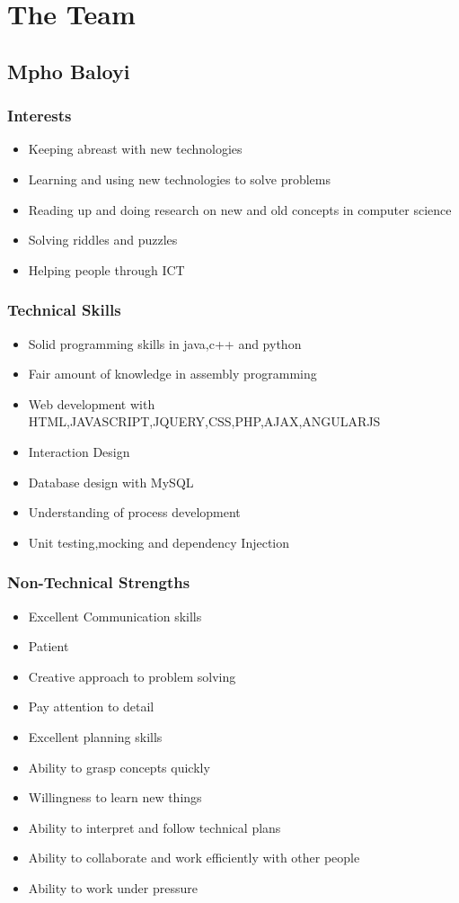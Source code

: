 \documentclass[a4paper,12pt]{article}
\begin{document}
\newpage
\tableofcontents
\newpage
\section{The Team}
\subsection{Mpho Baloyi}
\subsubsection{Interests}
\begin{itemize}
\item Keeping abreast with new technologies
\item Learning and using new technologies to solve problems
\item Reading up and doing research on new and old concepts in computer science
\item Solving riddles and puzzles
\item Helping people through ICT
\end{itemize}
\subsubsection{Technical Skills}
\begin{itemize}
\item Solid programming skills in java,c++ and python
\item Fair amount of knowledge in assembly programming 
\item Web development with HTML,JAVASCRIPT,JQUERY,CSS,PHP,AJAX,ANGULARJS
\item Interaction Design 
\item Database design with MySQL
\item Understanding of process development
\item Unit testing,mocking and dependency Injection
\end{itemize}
\subsubsection{Non-Technical Strengths}
\begin{itemize}
\item Excellent Communication skills
\item Patient 
\item Creative approach to problem solving
\item Pay attention to detail 
\item Excellent planning skills
\item Ability to grasp concepts quickly
\item Willingness to learn new things
\item Ability to interpret and follow technical plans
\item Ability to collaborate and work efficiently with other people
\item Ability to work under pressure
\end{itemize}
\end{document}
